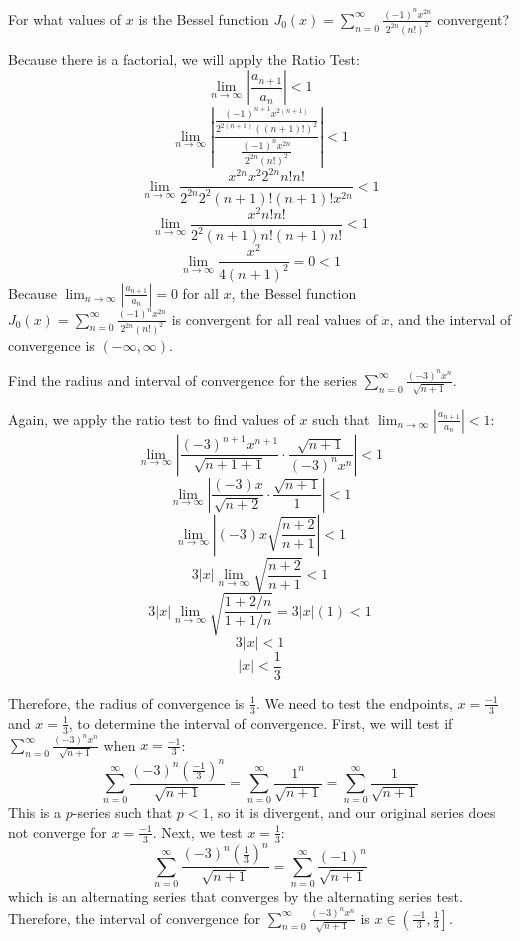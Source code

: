 \begin{Worked}
\begin{Problem}
For what values of $x$ is the Bessel function $J_0 (x) = 
\sum_{n=0}^\infty \frac{(-1)^n x^{2n}}{2^{2n}(n!)^2}$ convergent? 
\end{Problem}
\begin{Solution}
Because there is a factorial, we will apply the Ratio Test:
$$\lim_{n \to \infty} \left| \frac{a_{n + 1}}{a_n} \right| <  1$$
$$\lim_{n \to \infty} \left| \frac{\frac{(-1)^{n + 1} x^{2(n + 1)}}{2^{2(n + 1
)}((n + 1)!)^2}}{\frac{(-1)^n x^{2n}}{2^{2n}(n!)^2}} \right| < 1$$
$$\lim_{n \to \infty} \frac{x^{2n} x^2 2^{2n} n! n!}{2^{2n} 2^2 (n + 1)! (n +
1)! x^{2n}} < 1$$
$$\lim_{n \to \infty} \frac{x^2 n! n!}{2^2 (n + 1)n! (n + 1)n!} < 1$$
$$\lim_{n \to \infty} \frac{x^2}{4(n + 1)^2} = 0 < 1$$
Because $\lim_{n \to \infty} \left| \frac{a_{n + 1}}{a_n} \right| = 0$ for all 
$x$, the Bessel function $J_0 (x) = \sum_{n=0}^\infty \frac{(-1)^n x^{2n}}{2^{
2n}(n!)^2}$ is convergent for all real values of $x$, and the interval of 
convergence is $(-\infty, \infty)$. 
\end{Solution}
\end{Worked}

\begin{Worked}
\begin{Problem}
Find the radius and interval of convergence for the series 
$\sum_{n=0}^\infty \frac{(-3)^n x^n}{\sqrt{n + 1}}$.
\end{Problem}
\begin{Solution}
Again, we apply the ratio test to find values of $x$ such 
that $\lim_{n \to \infty} \left| \frac{a_{n + 1}}{a_n} \right| < 1$:
$$\lim_{n \to \infty} \left| \frac{(-3)^{n + 1} x^{n + 1}}{\sqrt{n + 1 + 1}} 
\cdot \frac{\sqrt{n + 1}}{(-3)^n x^n} \right| < 1$$
$$\lim_{n \to \infty} \left| \frac{(-3) x}{\sqrt{n + 2}} \cdot \frac{\sqrt{n + 
1}}{1} \right| < 1$$
$$\lim_{n \to \infty} \left| (-3)x \sqrt{\frac{n + 2}{n + 1}} \right| < 1$$
$$3|x| \lim_{n \to \infty} \sqrt{\frac{n + 2}{n + 1}} < 1$$
$$3|x| \lim_{n \to \infty} \sqrt{\frac{1 + 2/n}{1 + 1/n}} = 3|x|(1) < 1$$
$$3|x| < 1$$
$$|x| < \frac{1}{3}$$

Therefore, the radius of convergence is $\frac{1}{3}$. We need to test the 
endpoints, $x = \frac{-1}{3}$ and $x = \frac{1}{3}$, to determine the interval 
of convergence. First, we will test if $\sum_{n=0}^\infty \frac{(-3)^n x^n}{
\sqrt{n + 1}}$ when $x = \frac{-1}{3}$:
$$\sum_{n=0}^\infty \frac{(-3)^n \left( \frac{-1}{3} \right)^n}{\sqrt{n + 1}} 
= \sum_{n = 0}^\infty \frac{1^n}{\sqrt{n + 1}} = \sum_{n = 0}^\infty \frac{1}{
\sqrt{n + 1}}$$
This is a $p$-series such that $ p < 1$, so it is divergent, and our original 
series does not converge for $x = \frac{-1}{3}$. Next, we test $x = \frac{1}{3}$:
$$\sum_{n=0}^\infty \frac{(-3)^n \left( \frac{1}{3} \right)^n}{\sqrt{n + 1}} = 
\sum_{n = 0}^\infty \frac{(-1)^n}{\sqrt{n + 1}}$$
which is an alternating series that converges by the alternating series test. 
Therefore, the interval of convergence for $\sum_{n=0}^\infty \frac{(-3)^n x^n}
{\sqrt{n + 1}}$ is $x \in \left( \frac{-1}{3}, \frac{1}{3} \right]$. 
\end{Solution}
\end{Worked}

